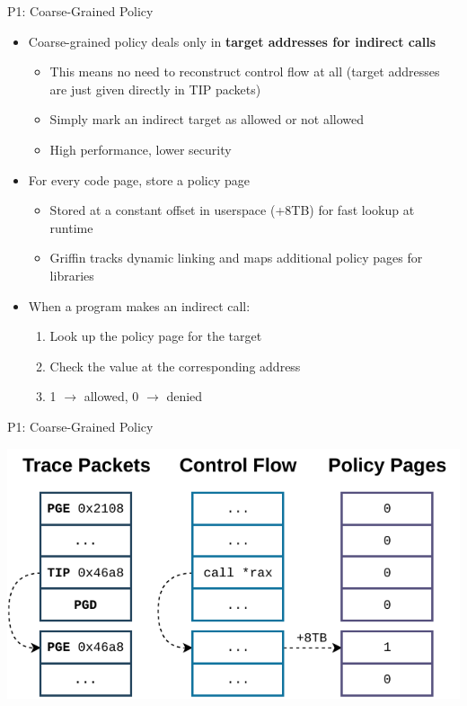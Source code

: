 \documentclass[12pt, dvipsnames, aspectratio=169]{beamer}
\begin{document}
\begin{frame}[c]{P1: Coarse-Grained Policy}{}
  \begin{itemize}
    \item Coarse-grained policy deals only in {\bf target addresses for indirect calls}
    \begin{itemize}
      \item This means no need to reconstruct control flow at all (target addresses are just given directly in TIP packets)
      \item Simply mark an indirect target as allowed or not allowed
      \item High performance, lower security
    \end{itemize}

    \vfill
    \item For every code page, store a policy page
    \begin{itemize}
      \item Stored at a constant offset in userspace (+8TB) for fast lookup at runtime
      \item Griffin tracks dynamic linking and maps additional policy pages for libraries
    \end{itemize}

    \vfill
    \item When a program makes an indirect call:
    \begin{enumerate}
      \item Look up the policy page for the target
      \item Check the value at the corresponding address
      \item 1 $\rightarrow$ allowed, 0 $\rightarrow$ denied
    \end{enumerate}
  \end{itemize}
\end{frame}

\begin{frame}[c]{P1: Coarse-Grained Policy}{}
  \begin{center}
    \color{black}
    \includegraphics[width=0.8\columnwidth]{figs/indirect_call.pdf}
  \end{center}
\end{frame}
\end{document}
